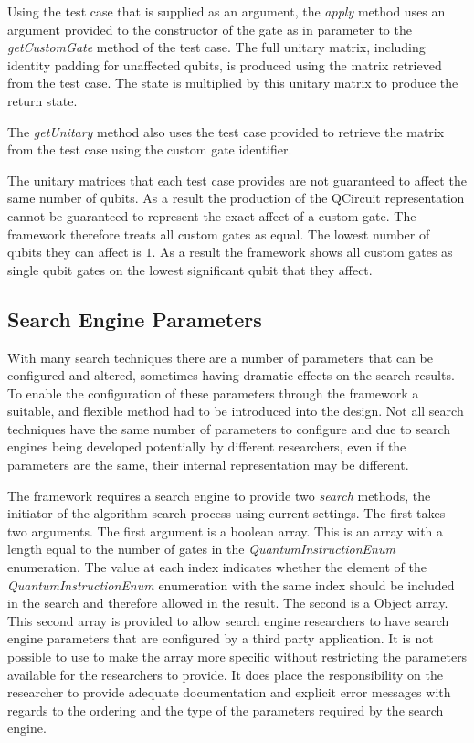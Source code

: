 Using the test case that is supplied as an argument, the \emph{apply} method uses an argument provided to the constructor of the gate as in parameter to the \emph{getCustomGate} method of the test case.
The full unitary matrix, including identity padding for unaffected qubits, is produced using the matrix retrieved from the test case.
The state is multiplied by this unitary matrix to produce the return state.

The \emph{getUnitary} method also uses the test case provided to retrieve the matrix from the test case using the custom gate identifier.

The unitary matrices that each test case provides are not guaranteed to affect the same number of qubits.
As a result the production of the QCircuit representation cannot be guaranteed to represent the exact affect of a custom gate.
The framework therefore treats all custom gates as equal.
The lowest number of qubits they can affect is $1$.
As a result the framework shows all custom gates as single qubit gates on the lowest significant qubit that they affect.

\subsection{Search Engine Parameters}
With many search techniques there are a number of parameters that can be configured and altered, sometimes having dramatic effects on the search results.
To enable the configuration of these parameters through the framework a suitable, and flexible method had to be introduced into the design.
Not all search techniques have the same number of parameters to configure and due to search engines being developed potentially by different researchers, even if the parameters are the same, their internal representation may be different.

The framework requires a search engine to provide two \emph{search} methods, the initiator of the algorithm search process using current settings.
The first takes two arguments.
The first argument is a boolean array.
This is an array with a length equal to the number of gates in the \emph{QuantumInstructionEnum} enumeration.
The value at each index indicates whether the element of the \emph{QuantumInstructionEnum} enumeration with the same index should be included in the search and therefore allowed in the result.
The second is a Object array.
This second array is provided to allow search engine researchers to have search engine parameters that are configured by a third party application.
It is not possible to use to make the array more specific without restricting the parameters available for the researchers to provide.
It does place the responsibility on the researcher to provide adequate documentation and explicit error messages with regards to the ordering and the type of the parameters required by the search engine.

